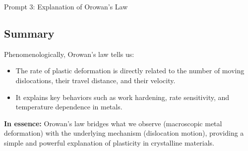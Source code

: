 \documentclass[12pt]{article}
\begin{document}
\newpage
\begin{summary}{Prompt 3: Explanation of Orowan's Law}
\subsection*{Summary}
Phenomenologically, Orowan’s law tells us:
\begin{itemize}
  \item The rate of plastic deformation is directly related to the number of
  moving dislocations, their travel distance, and their velocity.
  \item It explains key behaviors such as work hardening, rate sensitivity, and
  temperature dependence in metals.
\end{itemize}

\noindent
\textbf{In essence:} Orowan’s law bridges what we observe (macroscopic metal
deformation) with the underlying mechanism (dislocation motion), providing a
simple and powerful explanation of plasticity in crystalline materials.
\end{summary}
\end{document}
